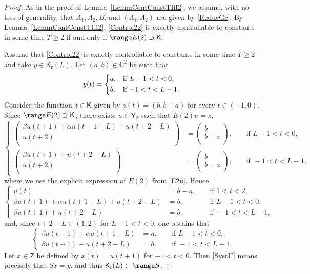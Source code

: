 \begin{proof}
As in the proof of Lemma~\ref{LemmContConstTIff2}, we assume, with no loss of generality, that $A_1, A_2, B$, and $(\Lambda_1, \Lambda_2)$ are given by \eqref{ReducGc}. By Lemma~\ref{LemmContConstTIff2}, \eqref{Control22} is exactly controllable to constants in some time $T \geq 2$ if and only if $\range E(2) \supset \mathsf K$.

Assume that \eqref{Control22} is exactly controllable to constants in some time $T \geq 2$ and take $y \in \mathsf K_{\mathrm r}(L)$. Let $(a, b) \in \mathbb C^2$ be such that
\[
y(t) = \begin{dcases*}
a, & if $L - 1 < t < 0$, \\
b, & if $-1 < t < L - 1$.
\end{dcases*}
\]
Consider the function $z \in \mathsf K$ given by $z(t) = (b, b - a)$ for every $t \in (-1, 0)$. Since $\range E(2) \supset \mathsf K$, there exists $u \in \mathsf Y_2$ such that $E(2) u = z$, \ie 
\[
\left\{
\begin{aligned}
\begin{pmatrix}
\beta u(t + 1) + \alpha u(t + 1 - L) + u(t + 2 - L) \\
u(t + 2) \\
\end{pmatrix} & = \begin{pmatrix}
b \\
b - a \\
\end{pmatrix}, & & \text{ if } L - 1 < t < 0, \\
\begin{pmatrix}
\beta u(t + 1) + u(t + 2 - L) \\
u(t + 2) \\
\end{pmatrix} & = \begin{pmatrix}
b \\
b - a \\
\end{pmatrix}, & & \text{ if } -1 < t < L - 1,
\end{aligned}
\right.
\]
where we use the explicit expression of $E(2)$ from \eqref{E2u}. Hence
\[
\left\{
\begin{aligned}
u(t) & = b - a, & & \text{ if } 1 < t < 2, \\
\beta u(t + 1) + \alpha u(t + 1 - L) + u(t + 2 - L) & = b, & & \text{ if } L - 1 < t < 0, \\
\beta u(t + 1) + u(t + 2 - L) & = b, & & \text{ if } -1 < t < L - 1,
\end{aligned}
\right.
\]
and, since $t + 2 - L \in (1, 2)$ for $L - 1 < t < 0$, one obtains that
\begin{equation}
\label{SystU}
\left\{
\begin{aligned}
\beta u(t + 1) + \alpha u(t + 1 - L) & = a, & & \text{ if } L - 1 < t < 0, \\
\beta u(t + 1) + u(t + 2 - L) & = b, & & \text{ if } -1 < t < L - 1.
\end{aligned}
\right.
\end{equation}
Let $x \in \mathsf Z$ be defined by $x(t) = u(t + 1)$ for $-1 < t < 0$. Then \eqref{SystU} means precisely that $S x = y$, and thus $\mathsf K_{\mathrm r}(L) \subset \range S$.


\end{proof}

